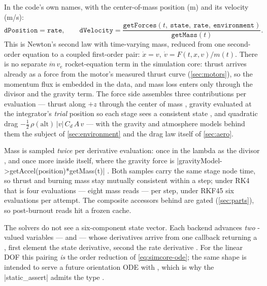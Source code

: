 In the code's own names, with  the center-of-mass position (m) and  its
velocity (m/s):
\begin{equation}\label{eq:simcore-ode}
\mathtt{dPosition} = \mathtt{rate},
\qquad
\mathtt{dVelocity} = \frac{\mathtt{getForces}(t,\ \mathtt{state},\ \mathtt{rate},\ \mathtt{environment})}{\mathtt{getMass}(t)} .
\end{equation}
This is Newton's second law with time-varying mass, reduced from one second-order equation to a
coupled first-order pair: $\dot{x}=v,\ \dot{v}=F(t,x,v)/m(t)$. There is no separate
$\dot{m}\,v_e$ rocket-equation term in the simulation core: thrust arrives already as a force
from the motor's measured thrust curve (\cref{sec:motors}), so the momentum flux is embedded in
the data, and mass loss enters only through the divisor and the gravity term. The force side
assembles three contributions per evaluation --- thrust along $+z$ through the center of mass
, gravity evaluated at the integrator's \emph{trial} position so
each stage sees a consistent state , and quadratic drag
$-\tfrac12\,\rho(\text{alt})\,\lvert v\rvert\,C_d\,A\,v$  --- with
the gravity and atmosphere models behind them the subject of \cref{sec:environment} and the drag
law itself of \cref{sec:aero}.

Mass is sampled \emph{twice} per derivative evaluation: once in the lambda as the divisor
, and once more inside  itself, where the gravity
force is \cppinline|gravityModel->getAccel(position)*getMass(t)|
. Both samples carry the same stage node time, so thrust and
burning mass stay mutually consistent within a step; under RK4 that is four evaluations --- eight
mass reads --- per step, under RKF45 six evaluations per attempt. The composite accessors behind
 are gated (\cref{sec:parts}), so post-burnout reads hit a frozen cache.

The solvers do not see a six-component state vector. Each backend advances \emph{two}
-valued variables ---  and  --- whose derivatives arrive from one
callback returning a , first element the state derivative, second the rate
derivative . For the linear DOF this pairing \emph{is} the order
reduction of \cref{eq:simcore-ode}; the same shape is intended to serve a future orientation ODE
with , which is why the \cppinline|static_assert| admits the type
.

